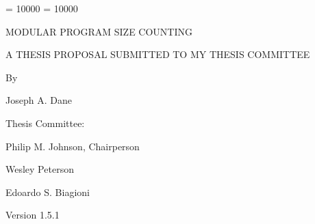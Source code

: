 
\clubpenalty = 10000    
\widowpenalty = 10000
\sloppy
\thispagestyle{empty}

\par\vspace*{0.00in}

\begin{center}
  MODULAR PROGRAM SIZE COUNTING\\ 

\end{center}

\vspace*{0.6in}

  \begin{center}  
  A THESIS PROPOSAL SUBMITTED TO MY THESIS COMMITTEE\\
  
\end{center}

\begin{center}

\vspace*{0.7in}
 
  By   
  
  \vspace{.2in}
  
  Joseph A. Dane
  
  \vspace{0.2in}
\end{center}  

\begin{center}
  Thesis Committee:
  \vspace{0.2in}

  Philip M. Johnson, Chairperson

  Wesley Peterson

  Edoardo S. Biagioni

\end{center}

\vspace*{1in}
\begin{center}
  Version 1.5.1
\end{center}

